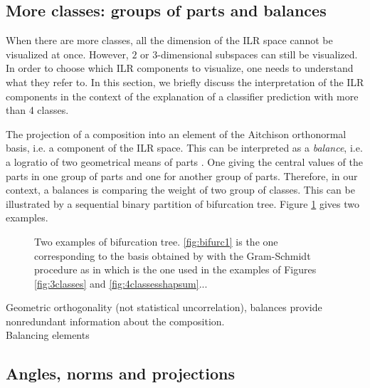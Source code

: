 \documentclass{article}
\theoremstyle{plain}
\theoremstyle{definition}
\theoremstyle{remark}
\begin{document}
\subsection{More classes: groups of parts and balances}
\label{sec:balances}

When there are more classes, all the dimension of the ILR space cannot be visualized at once. However, $2$ or $3$-dimensional subspaces can still be visualized. In order to choose which ILR components to visualize, one needs to understand what they refer to. In this section, we briefly discuss the interpretation of the ILR components in the context of the explanation of a classifier prediction with more than 4 classes.

The projection of a composition into an element of the Aitchison orthonormal basis, i.e. a component of the ILR space. This can be interpreted as a \emph{balance}, i.e. a logratio of two geometrical means of parts \cite{egozcue2003isometric,egozcue2005groups,pawlowskymodeling}. One giving the central values of the parts in one group of parts and one for another group of parts. Therefore, in our context, a balances is comparing the weight of two group of classes. This can be illustrated by a sequential binary partition of bifurcation tree. Figure \ref{fig:trees} gives two examples.
\begin{figure}
  \centering
  \subfigure[]{\label{fig:bifurc1}
    
    }
  \subfigure[]{\label{fig:bifurc2}
    
  }
  \caption{Two examples of bifurcation tree. \ref{fig:bifurc1} is the one corresponding to the basis obtained by with the Gram-Schmidt procedure as in \cite{egozcue2003isometric} which is the one used in the examples of Figures \ref{fig:3classes} and \ref{fig:4classesshapsum}...}
  \label{fig:trees}
\end{figure}

Geometric orthogonality (not statistical uncorrelation), balances provide nonredundant information about the composition.\\
Balancing elements\\
\cite{egozcue2005groups}

\subsection{Angles, norms and projections}
\end{document}
